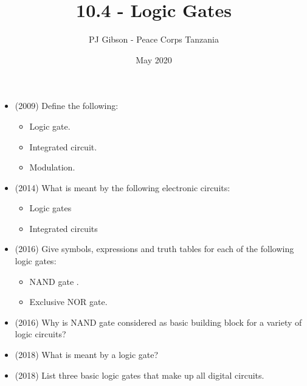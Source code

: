 \documentclass{article}
\title{\textbf{10.4 - Logic Gates}}
\author{PJ Gibson - Peace Corps Tanzania}
\date{May 2020}
\begin{document}
\maketitle

\begin{itemize}
\item (2009)  Define the following:
 \begin{itemize}
\item Logic gate.
\item Integrated circuit.
\item Modulation.
\end{itemize}
\item (2014)  What is meant by the following electronic circuits:
 \begin{itemize}
\item Logic gates 
\item Integrated circuits
\end{itemize}
\item (2016)  Give symbols, expressions and truth tables for each of the following logic gates: 
 \begin{itemize}
\item NAND gate .
\item Exclusive NOR gate.
\end{itemize}
\item (2016)  Why is NAND gate considered as basic building block for a variety of logic circuits?
\item (2018)  What is meant by a logic gate? 
\item (2018)  List three basic logic gates that make up all digital circuits. 
\end{itemize}
\end{document}
